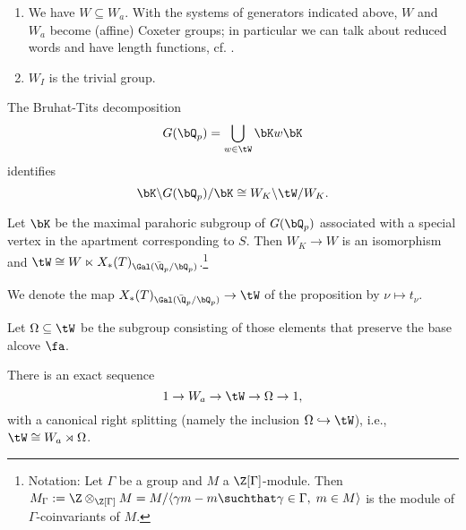 \documentclass[a4paper]{scrartcl} %
\numberwithin{equation}{section}
\begin{document}
\begin{Remarks}
  \begin{enumerate}[(1)]
  \item We have $W\subseteq W_a$. With the systems of generators indicated above, $W$ and $W_a$ become (affine) Coxeter groups; in particular we can talk about reduced words and have length functions, cf. \cite{brenti}.
  \item $W_I$ is the trivial group.
  \end{enumerate}
\end{Remarks}

\begin{Proposition}\textnormal{\cite[Prop.~8]{hainesrap}}\label{bt-decomp}
  The Bruhat-Tits decomposition
  \begin{equation*}
    G(\bQ_p) = \bigcup_{w\in \tW}\bK w\bK
  \end{equation*}
  identifies
  \begin{equation*}
    \bK\backslash G(\bQ_p) / \bK \cong W_K\backslash \tW/W_K.
  \end{equation*}
\end{Proposition}

\begin{Proposition}\textnormal{\cite[Prop.~13]{hainesrap}}
  Let $\bK$ be the maximal parahoric subgroup of $G(\bQ_p)$ associated with a special vertex in the apartment corresponding to $S$. Then $W_K\to W$ is an isomorphism and $\tW\cong W\ltimes X_*(T)_{\Gal(\bar\Q_p/\bQ_p)}$.\footnote{Notation: Let $\Gamma$ be a group and $M$ a $\Z[\Gamma]$-module. Then $M_\Gamma:=\Z\otimes_{\Z[\Gamma]}M=M/\langle \gamma m-m \suchthat \gamma\in\Gamma,\; m\in M\rangle$ is the module of $\Gamma$-coinvariants of $M$.}
\end{Proposition}

\begin{Notation}
  We denote the map $X_*(T)_{\Gal(\bar\Q_p/\bQ_p)}\to \tW$ of the proposition by $\nu\mapsto t_\nu$.
\end{Notation}

\begin{Proposition}\textnormal{\cite[Lemma~14]{hainesrap}}
  Let $\Omega\subseteq\tW$ be the subgroup consisting of those elements that preserve the base alcove $\fa$.
  
  There is an exact sequence
  \begin{equation*}
    1 \to W_a \to \tW \to \Omega \to 1,
  \end{equation*}
  with a canonical right splitting (namely the inclusion $\Omega\hookrightarrow \tW$), i.e., $\tW \cong W_a\rtimes\Omega$.
\end{Proposition}
\end{document}
